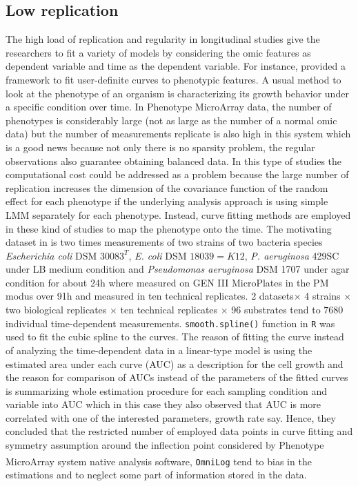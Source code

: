 \documentclass[]{article}
\begin{document}
		\subsection{Low replication}
		The high load of replication and regularity in longitudinal studies give the researchers to fit a variety of models by considering the omic features as dependent variable and time as the dependent variable. For instance, \cite{Vaas2012} provided a framework to fit user-definite curves to phenotypic features. A usual method to look at the phenotype of an organism is characterizing its growth behavior under a specific condition over time. In Phenotype MicroArray data, the number of phenotypes is considerably large (not as large as the number of a normal omic data) but the number of measurements replicate is also high in this system which is a good news because not only there is no sparsity problem, the regular observations also guarantee obtaining balanced data. In this type of studies the computational cost could be addressed as a problem because the large number of replication increases the dimension of the covariance function of the random effect for each phenotype if the underlying analysis approach is using simple LMM separately for each phenotype. Instead, curve fitting methods are employed in these kind of studies to map the phenotype onto the time. The motivating dataset in \cite{Vaas2012} is two times measurements of two strains of two bacteria species \textit{Escherichia coli} DSM $30083^T$, \textit{E. coli} DSM $18039 = K12$, \textit{P. aeruginosa} 429SC under LB medium condition and \textit{Pseudomonas aeruginosa} DSM 1707 under agar condition for about 24h where measured on GEN III MicroPlates in the PM modus over 91h and measured in ten technical replicates.  2 datasets$\times$ 4 strains $\times$ two biological replicates $\times$ ten technical replicates $\times$ 96 substrates tend to $7680$ individual time-dependent measurements. \texttt{smooth.spline()} function in \texttt{R} was used to fit the cubic spline to the curves. The reason of fitting the curve instead of analyzing the time-dependent data in a linear-type model is using the estimated area under each curve (AUC) as a description for the cell growth and the reason for comparison of AUCs instead of the parameters of the fitted curves is summarizing whole estimation procedure for each sampling condition and variable into AUC which in this case they also observed that AUC is more correlated with one of the interested parameters, growth rate say. Hence, they concluded that the restricted number of employed data points in curve fitting and symmetry assumption around the inflection point considered by Phenotype MicroArray system native analysis software, \texttt{OmniLog}\textsuperscript{\tiny\textregistered} tend to bias in the estimations and to neglect some part of information stored in the data. 
		
\end{document}
